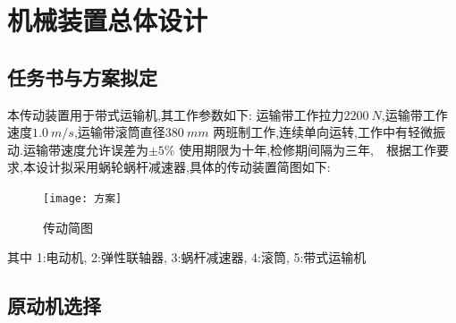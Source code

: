 \documentclass[UTF8,11pt,a4paper,oneside,final,zihao=-4,]{ctexrep}%
\begin{document}
	\tableofcontents			%
	\newpage
	\chapter{机械装置总体设计}
	\newcommand{\Ff}{2200}		%
	\newcommand{\Vv}{1.0}			%
	\newcommand{\Dd}{380}			%
	\newcommand{\ETAgt}{0.96}		%
	\newcommand{\NUMgt}{1}
	\newcommand{\ETAlzq}{0.99}		%
	\newcommand{\NUMlzq}{2}
	\newcommand{\ETAgzzc}{0.98}		%
	\newcommand{\NUMgzzc}{3}
	\newcommand{\ETAwlwg}{0.84}		%
	\newcommand{\Nmin}{10}			%
	\newcommand{\Nmax}{20}			%
	\newcommand{\Nw}{\fpeval{60*1000*\Vv/ 3.1415926535/\Dd}}
	\newcommand{\Ndmin}{\fpeval{\Nw*\Nmin}}
	\newcommand{\Ndmax}{\fpeval{\Nw*\Nmax}}
	\newcommand{\Pw}{\fpeval{\Ff * \Vv/1000}}		%
	\newcommand{\ETA}{\fpeval{\ETAgt^\NUMgt*\ETAgzzc^\NUMgzzc*\ETAlzq^\NUMlzq*\ETAwlwg}}	%
	\newcommand{\ETAI}{\fpeval{\ETAgzzc*\ETAlzq}}		%
	\newcommand{\ETAII}{\ETAwlwg}						%
	\newcommand{\Pd}{\fpeval{\Pw/\ETA}}					%
	\newcommand{\Ped}{3}								%
	\newcommand{\Nm}{960}								%
	\newcommand{\Aa}{160}								%
	\newcommand{\Ia}{\fpeval{960/ \Nw}}
	\section{任务书与方案拟定}
	本传动装置用于带式运输机,其工作参数如下: 运输带工作拉力$\Ff\ N$,运输带工作速度$\Vv\ m/s$,运输带滚筒直径$\Dd\ mm$
	两班制工作,连续单向运转,工作中有轻微振动.运输带速度允许误差为$\pm5\%$
	使用期限为十年,检修期间隔为三年,\ \
	根据工作要求,本设计拟采用蜗轮蜗杆减速器,具体的传动装置简图如下:
	\begin{figure}[H]
		\centering
		\texttt{[image: 方案]}
		\caption[蜗轮蜗杆传动]{传动简图}
		\label{fig:}
	\end{figure}
	其中 1:电动机, 2:弹性联轴器, 3:蜗杆减速器, 4:滚筒, 5:带式运输机\ \
	\section{原动机选择}
\end{document}
